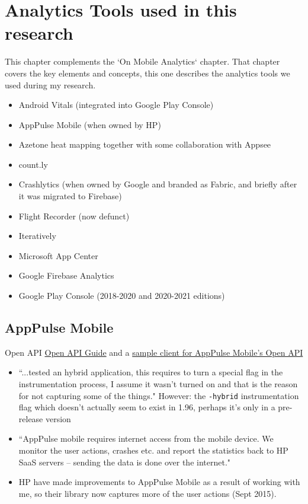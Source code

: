 \chapter{Analytics Tools used in this research}
\label{appendix-analytics-tools}

This chapter complements the `On Mobile Analytics` chapter. That chapter covers the key elements and concepts, this one describes the analytics tools we used during my research.

\begin{itemize}
    \item Android Vitals (integrated into Google Play Console)
    \item AppPulse Mobile (when owned by HP)
    \item Azetone heat mapping together with some collaboration with Appsee
    \item count.ly
    \item Crashlytics (when owned by Google and branded as Fabric, and briefly after it was migrated to Firebase)
    \item Flight Recorder (now defunct)
    \item Iteratively
    \item Microsoft App Center
    \item Google Firebase Analytics
    \item Google Play Console (2018-2020 and 2020-2021 editions)
\end{itemize}

\section{AppPulse Mobile}

Open API \href{https://github.com/MicroFocus/apmobile-openapiclient/blob/master/doc/AppPulse_Mobile_Open_API_Guide.pdf}{Open API Guide} and a  \href{https://github.com/MicroFocus/apmobile-openapiclient}{sample client for AppPulse Mobile's Open API}

\begin{itemize}
    \item ``...tested an hybrid application, this requires to turn a special flag in the instrumentation process, I assume it wasn’t turned on and that is the reason for not capturing some of the things." However: the \texttt{-hybrid} instrumentation flag which doesn't actually seem to exist in 1.96, perhaps it's only in a pre-release version
    \item ``AppPulse mobile requires internet access from the mobile device. We monitor the user actions, crashes etc. and report the statistics back to HP SaaS servers – sending the data is done over the internet."
    \item HP have made improvements to AppPulse Mobile as a result of working with me, so their library now captures more of the user actions (Sept 2015).
\end{itemize}

